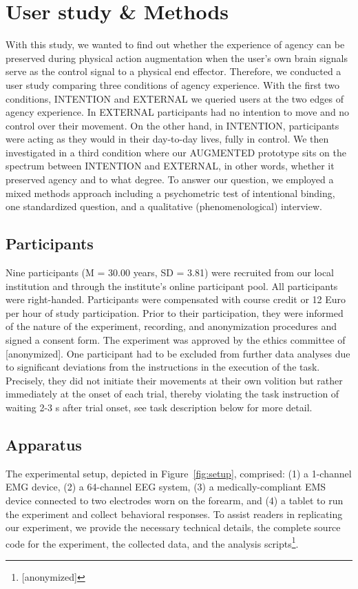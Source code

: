 
\section{User study \& Methods}
With this study, we wanted to find out whether the experience of agency can be preserved during physical action augmentation when the user's own brain signals serve as the control signal to a physical end effector. Therefore, we conducted a user study comparing three conditions of agency experience. With the first two conditions, INTENTION and EXTERNAL we queried users at the two edges of agency experience. In EXTERNAL participants had no intention to move and no control over their movement. On the other hand, in INTENTION, participants were acting as they would in their day-to-day lives, fully in control. We then investigated in a third condition where our AUGMENTED prototype sits on the spectrum between INTENTION and EXTERNAL, in other words, whether it preserved agency and to what degree. To answer our question, we employed a mixed methods approach including a psychometric test of intentional binding, one standardized question, and a qualitative (phenomenological) interview.


\subsection{Participants}
Nine participants (M = 30.00 years, SD = 3.81) were recruited from our local institution and through the institute's online participant pool. All participants were right-handed. Participants were compensated with course credit or 12 Euro per hour of study participation. Prior to their participation, they were informed of the nature of the experiment, recording, and anonymization procedures and signed a consent form. The experiment was approved by the ethics committee of [anonymized]. One participant had to be excluded from further data analyses due to significant deviations from the instructions in the execution of the task. Precisely, they did not initiate their movements at their own volition but rather immediately at the onset of each trial, thereby violating the task instruction of waiting 2-3 s after trial onset, see task description below for more detail.

\subsection{Apparatus}
The experimental setup, depicted in Figure~\ref{fig:setup}, comprised: (1) a 1-channel EMG device, (2) a 64-channel EEG system, (3) a medically-compliant EMS device connected to two electrodes worn on the forearm, and (4) a tablet to run the experiment and collect behavioral responses. To assist readers in replicating our experiment, we provide the necessary technical details, the complete source code for the experiment, the collected data, and the analysis scripts\footnote{[anonymized]}.

